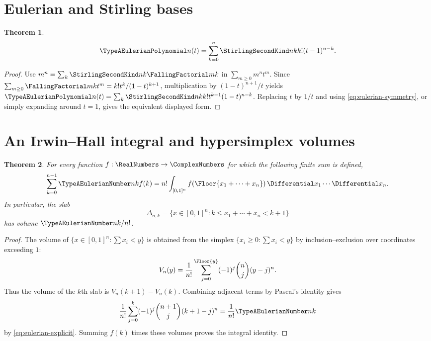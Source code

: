 \documentclass[11pt,a4paper,oneside,openany]{book}
\newtheorem{theorem}{Theorem}[chapter]
\theoremstyle{definition}
\theoremstyle{remark}
\begin{document}
\section{Eulerian and Stirling bases}
\begin{theorem}\label{thm:eulerian-stirling}
\begin{equation}\label{eq:eulerian-stirling}
 \TypeAEulerianPolynomial n(t)=\sum_{k=0}^{n}\StirlingSecondKind nk k!(t-1)^{n-k}.
\end{equation}
\end{theorem}
\begin{proof}
Use $m^n=\sum_k\StirlingSecondKind nk\FallingFactorial mk$ in
$\sum_{m\ge0}m^nt^m$.  Since
$\sum_{m\ge0}\FallingFactorial mk t^m=k!t^k/(1-t)^{k+1}$, multiplication by
$(1-t)^{n+1}/t$ yields
$\TypeAEulerianPolynomial n(t)=\sum_k\StirlingSecondKind nk k!t^{k-1}(1-t)^{n-k}$.  Replacing $t$ by $1/t$ and
using \eqref{eq:eulerian-symmetry}, or simply expanding around $t=1$, gives the
equivalent displayed form.
\end{proof}

\section{An Irwin--Hall integral and hypersimplex volumes}
\begin{theorem}\label{thm:eulerian-irwin-hall}
For every function $f:\RealNumbers\to\ComplexNumbers$ for which the following finite sum is defined,
\begin{equation}\label{eq:eulerian-irwin-hall}
 \sum_{k=0}^{n-1}\TypeAEulerianNumber nk f(k)
 =n!\int_{[0,1]^n}f\!\left(\Floor{x_1+\cdots+x_n}\right)
 \Differential x_1\cdots\Differential x_n.
\end{equation}
In particular, the slab
\[
 \Delta_{n,k}=\{x\in[0,1]^n:k\le x_1+\cdots+x_n<k+1\}
\]
has volume $\TypeAEulerianNumber nk/n!$.
\end{theorem}
\begin{proof}
The volume of $\{x\in[0,1]^n:\sum x_i<y\}$ is obtained from the simplex
$\{x_i\ge0:\sum x_i<y\}$ by inclusion--exclusion over coordinates exceeding $1$:
\[
 V_n(y)=\frac1{n!}\sum_{j=0}^{\Floor{y}}(-1)^j\binom nj(y-j)^n.
\]
Thus the volume of the $k$th slab is $V_n(k+1)-V_n(k)$.  Combining adjacent terms
by Pascal's identity gives
\[
 \frac1{n!}\sum_{j=0}^{k}(-1)^j\binom{n+1}{j}(k+1-j)^n
 =\frac1{n!}\TypeAEulerianNumber nk
\]
by \eqref{eq:eulerian-explicit}.  Summing $f(k)$ times these volumes proves the
integral identity.
\end{proof}
\end{document}
